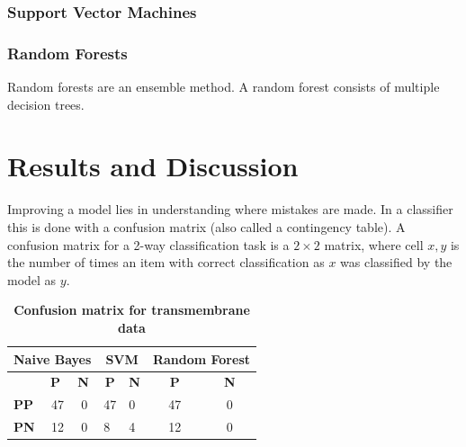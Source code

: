 \documentclass[10pt,letterpaper]{article}
\begin{document}
	\subsubsection*{Support Vector Machines}
	
	\subsubsection*{Random Forests}
	Random forests are an ensemble method. A random forest consists of multiple decision trees. 
	
	
	\section*{Results and Discussion}
	
	Improving a model lies in understanding where mistakes are made. In a classifier this is done with a confusion matrix (also called a contingency table). A confusion matrix for a 2-way classification task is a $2 \times 2$ matrix, where cell $x,y$ is the number of times an item with correct classification as $x$ was classified by the model as $y$. 

	\begin{table}[!ht]
		\centering
		\caption{{\bf Confusion matrix for transmembrane data}}
		\label{tab:conf-tm}
		\begin{tabular}{lccllcc}
			\multicolumn{3}{l}{Naive Bayes}                                                & \multicolumn{2}{c}{SVM}                                          & \multicolumn{2}{l}{Random Forest} \\ \hline
			& \multicolumn{1}{l}{\textbf{P}} & \multicolumn{1}{l|}{\textbf{N}} & \multicolumn{1}{c}{\textbf{P}} & \multicolumn{1}{c|}{\textbf{N}} & \textbf{P}      & \textbf{N}      \\ \hline
			\textbf{PP} & 47                             & \multicolumn{1}{c|}{0}          & 47                             & \multicolumn{1}{l|}{0}          & 47              & 0               \\
			\textbf{PN} & 12                             & \multicolumn{1}{c|}{0}          & 8                              & \multicolumn{1}{l|}{4}          & 12              & 0               \\ \hline
		\end{tabular}
	\end{table}
\end{document}
